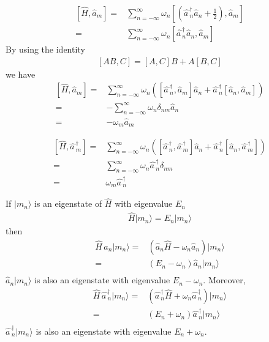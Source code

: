   
\begin{align}
  \left[\widehat{H},\widehat{a}_{m}\right]=&
  \sum_{n=-\infty}^{\infty} \omega_n
  \left[\left(\widehat{a\,}_{n}^\dagger\widehat{a}_{n} +\frac{1}{2}\right),\widehat{a}_{m}\right]\nonumber\\
  =&\sum_{n=-\infty}^{\infty} \omega_n\left[\widehat{a\,}_{n}^\dagger\widehat{a}_{n},\widehat{a}_{m}\right]
\end{align}
By using the identity
\begin{align}
  \left[A B,C\right]=\left[A,C\right]B+A\left[B,C\right]
\end{align}
we have
\begin{align}
\label{eq:19}
   \left[\widehat{H},\widehat{a}_{m}\right]=&
\sum_{n=-\infty}^{\infty} \omega_n\left(
\left[\widehat{a\,}_{n}^\dagger,\widehat{a}_{m}\right]\widehat{a}_{n}
+\widehat{a\,}_{n}^\dagger\left[\widehat{a}_{n},\widehat{a}_{m}\right]
\right)\nonumber\\
=&-\sum_{n=-\infty}^{\infty} \omega_n
\delta_{n m}\widehat{a}_{n}
\nonumber\\
=&- \omega_m\widehat{a}_{m}
\end{align}

\begin{align}
\label{eq:20}
   \left[\widehat{H},\widehat{a\,}_{m}^\dagger\right]=&
\sum_{n=-\infty}^{\infty} \omega_n\left(
\left[\widehat{a\,}_{n}^\dagger,\widehat{a\,}_{m}^\dagger\right]\widehat{a}_{n}
+\widehat{a\,}_{n}^\dagger\left[\widehat{a}_{n},\widehat{a\,}_{m}^\dagger\right]
\right)\nonumber\\
=&\sum_{n=-\infty}^{\infty} \omega_n
\widehat{a\,}_{n}^\dagger\delta_{n m}
\nonumber\\
=& \omega_m\widehat{a\,}_{n}^\dagger
\end{align}

If $|m_n\rangle$ is an eigenstate of $\widehat{H}$ with eigenvalue $E_n$
\begin{align}
  \widehat{H}|m_n\rangle=E_n|m_n\rangle
\end{align}
then
\begin{align}
  \widehat{H}\,\widehat{a}_{n}|m_n\rangle=&
\left(\widehat{a}_{n}\widehat{H}-\omega_n\widehat{a}_{n}\right)|m_n\rangle\nonumber\\
=&\left(E_n-\omega_n\right)\widehat{a}_{n}|m_n\rangle\nonumber\\
\end{align}
$\widehat{a}_{n}|m_n\rangle$ is also an eigenstate with eigenvalue $E_n-\omega_n$. Moreover,
\begin{align}
  \widehat{H}\,\widehat{a\,}_{n}^\dagger|m_n\rangle=&
\left(\widehat{a\,}_{n}^\dagger\widehat{H}+\omega_n\widehat{a\,}_{n}^\dagger\right)|m_n\rangle\nonumber\\
=&\left(E_n+\omega_n\right)\widehat{a\,}_{n}^\dagger|m_n\rangle\nonumber\\
\end{align}
$\widehat{a\,}_{n}^\dagger|m_n\rangle$ is also an eigenstate with eigenvalue $E_n+\omega_n$. 

